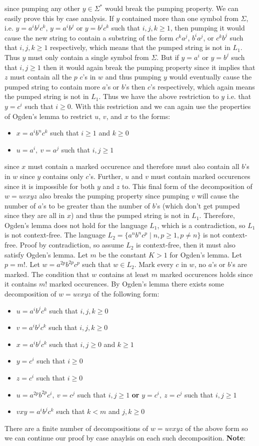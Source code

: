 \documentclass[12pt]{article}
\begin{document}
since pumping any other $y \in \Sigma^*$ would break the pumping property. We
can easily prove this by case analysis. If $y$ contained more than one symbol
from $\Sigma$, i.e. $y=a^ib^jc^k$, $y=a^ib^j$ or $y=b^jc^k$ such that $i,j,k\ge
1$, then pumping it would cause the new string to contain a substring of the
form $c^ka^j$, $b^ia^j$, or $c^kb^j$ such that $i,j,k\ge 1$ respectively,
which means that the pumped string is not in $L_1$. Thus $y$ must only contain
a single symbol from $\Sigma$. But if $y=a^i$ or $y=b^j$ such that $i,j\ge 1$
then it would again break the pumping property since it implies that $z$ must
contain all the $p$ $c$'s in $w$ and thus pumping $y$ would eventually cause
the pumped string to contain more $a$'s or $b$'s then $c$'s respectively,
which again means the pumped string is not in $L_1$. Thus we have the above
restriction to $y$ i.e. that $y=c^i$ such that $i\ge 0$. With this restriction
and we can again use the properties of Ogden's lemma to restrict $u$, $v$, and
$x$ to the forms:
\begin{itemize}
\item $x=a^ib^nc^k$ such that $i\ge 1$ and $k\ge 0$
\item $u=a^i,\ v=a^j$ such that $i,j\ge 1$
\end{itemize}
since $x$ must contain a marked occurence and therefore must also contain all
$b$'s in $w$ since $y$ contains only $c$'s. Further, $u$ and $v$ must contain
marked occurences since it is impossible for both $y$ and $z$ to. This final
form of the decomposition of $w=uvxyz$ also breaks the pumping property since
pumping $v$ will cause the number of $a$'s to be greater than the number of
$b$'s (which don't get pumped since they are all in $x$) and thus the pumped
string is not in $L_1$. Therefore, Ogden's lemma does not hold for the language
$L_1$, which is a contradiction, so $L_1$ is not context-free.
\newpage
The language $L_2 = \{a^nb^nc^p \mid n,p\ge 1, p\neq n\}$ is not context-free.
Proof by contradiction, so assume $L_2$ is context-free, then it must also
satisfy Ogden's lemma. Let $m$ be the constant $K > 1$ for Ogden's lemma.
Let $p=m!$. Let $w = a^{2p}b^{2p}c^p$ such that $w \in L_2$. Mark every $c$ in
$w$, no $a$'s or $b$'s are marked. The condition that $w$ contains at least $m$
marked occurences holds since it contains $m!$ marked occurences. By Ogden's
lemma there exists some decomposition of $w = uvxyz$ of the following form:
\begin{itemize}
\item $u=a^ib^jc^k$ such that $i,j,k\ge 0$
\item $v=a^ib^jc^k$ such that $i,j,k\ge 0$
\item $x=a^ib^jc^k$ such that $i,j\ge 0$ and $k\ge 1$
\item $y=c^i$ such that $i\ge 0$
\item $z=c^i$ such that $i\ge 0$
\item $u=a^{2p}b^{2p}c^i,\ v=c^j$ such that $i,j\ge 1$ \textbf{or}
$y=c^i,\ z=c^j$ such that $i,j\ge 1$
\item $vxy = a^ib^jc^k$ such that $k<m$ and $j,k\ge 0$
\end{itemize}
There are a finite number of decompositions of $w=uvxyz$ of the above form so we
can continue our proof by case anaylsis on each such decomposition.
\vspace{3mm}
\newline
\textbf{Note}:
\end{document}
